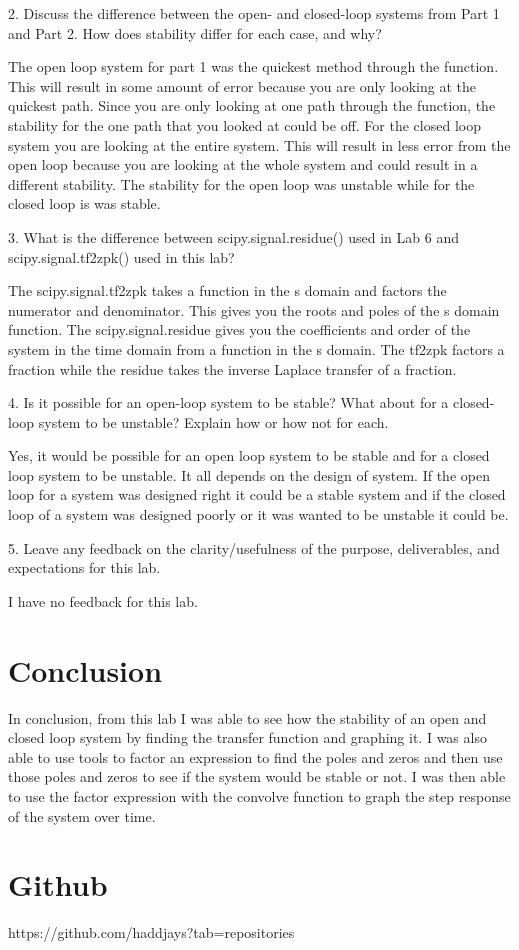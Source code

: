 \documentclass[11pt,a4]{report}
\begin{document}
2. Discuss the difference between the open- and closed-loop systems from Part 1 and Part 2.
How does stability differ for each case, and why?

The open loop system for part 1 was the quickest method through the function. This will result in some amount of error because you are only looking at the quickest path. Since you are only looking at one path through the function, the stability for the one path that you looked at could be off. For the closed loop system you are looking at the entire system. This will result in less error from the open loop because you are looking at the whole system and could result in a different stability. The stability for the open loop was unstable while for the closed loop is was stable. 

3. What is the difference between scipy.signal.residue() used in Lab 6 and
scipy.signal.tf2zpk() used in this lab?

The scipy.signal.tf2zpk takes a function in the s domain and factors the numerator and denominator. This gives you the roots and poles of the s domain function. The scipy.signal.residue gives you the coefficients and order of the system in the time domain from a function in the s domain. The tf2zpk factors a fraction while the residue takes the inverse Laplace transfer of a fraction.

4. Is it possible for an open-loop system to be stable? What about for a closed-loop system to
be unstable? Explain how or how not for each.

Yes, it would be possible for an open loop system to be stable and for a closed loop system to be unstable. It all depends on the design of system. If the open loop for a system was designed right it could be a stable system and if the closed loop of a system was designed poorly or it was wanted to be unstable it could be. 

5. Leave any feedback on the clarity/usefulness of the purpose, deliverables, and expectations
for this lab.

I have no feedback for this lab. 

\section{Conclusion}
In conclusion, from this lab I was able to see how the stability of an open and closed loop system by finding the transfer function and graphing it. I was also able to use tools to factor an expression to find the poles and zeros and then use those poles and zeros to see if the system would be stable or not. I was then able to use the factor expression with the convolve function to graph the step response of the system over time. 


\section{Github}
https://github.com/haddjays?tab=repositories
\end{document}
